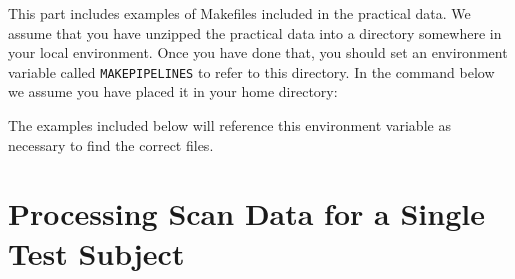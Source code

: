 \label{part:examples}

\begin{vplace}[0.7]
	
	\thispagestyle{empty}
	\large
	\noindent This part includes examples of Makefiles included in the practical	data. We assume that you have unzipped the practical data into a directory somewhere in your local environment. Once you have done that, you should set an environment variable called \texttt{MAKEPIPELINES} to refer to this directory. In the command below we assume you have placed it in your home directory:
	
	The examples included below will reference this environment variable as necessary to find the correct files.
	
\end{vplace}




 \clearpage \setcounter{codehighlight}{0}
 \clearpage  \setcounter{codehighlight}{0}
 \clearpage \setcounter{codehighlight}{0}


\chapter{Processing Scan Data for a Single Test Subject}
 \clearpage \setcounter{codehighlight}{0}
\clearpage \setcounter{codehighlight}{0}
 \clearpage \setcounter{codehighlight}{0}
 \clearpage \setcounter{codehighlight}{0}

 \clearpage  \setcounter{codehighlight}{0}
 \clearpage  \setcounter{codehighlight}{0}
